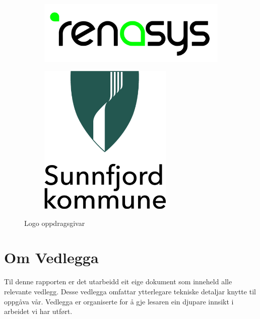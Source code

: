 \begin{figure}[htbp]
    \centering
    \begin{subfigure}[b]{0.3\textwidth}
        \centering
        \includegraphics[width=1\textwidth]{Bilder/renasys.png}
    \end{subfigure}
    \hfill
    \begin{subfigure}[b]{0.3\textwidth}
        \centering
        \includegraphics[width=0.7\textwidth]{Bilder/SK.png}
    \end{subfigure}
    \caption{Logo oppdragsgivar}\label{fig:Oppdragsgivar}
\end{figure}

\section{Om Vedlegga}
Til denne rapporten er det utarbeidd eit eige dokument som inneheld alle relevante vedlegg. 
Desse vedlegga omfattar ytterlegare tekniske detaljar knytte til oppgåva vår.\newline
Vedlegga er organiserte for å gje lesaren ein djupare innsikt i arbeidet vi har utført.